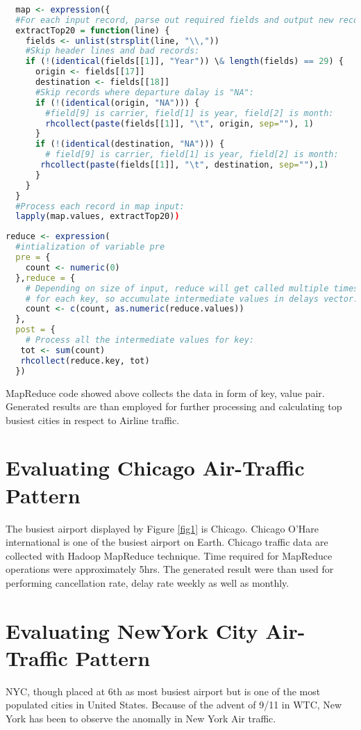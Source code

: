 \begin{lstlisting}[language=R]
  
  map <- expression({
  #For each input record, parse out required fields and output new record:
  extractTop20 = function(line) {
    fields <- unlist(strsplit(line, "\\,"))
    #Skip header lines and bad records:
    if (!(identical(fields[[1]], "Year")) \& length(fields) == 29) {
      origin <- fields[[17]]
      destination <- fields[[18]]
      #Skip records where departure dalay is "NA":
      if (!(identical(origin, "NA"))) {
        #field[9] is carrier, field[1] is year, field[2] is month:
        rhcollect(paste(fields[[1]], "\t", origin, sep=""), 1)
      }
      if (!(identical(destination, "NA"))) {
        # field[9] is carrier, field[1] is year, field[2] is month:
       rhcollect(paste(fields[[1]], "\t", destination, sep=""),1)
      }
    }
  }
  #Process each record in map input:
  lapply(map.values, extractTop20))
\end{lstlisting}

\begin{lstlisting}[language=R]
reduce <- expression(
  #intialization of variable pre
  pre = {
    count <- numeric(0)
  },reduce = {
    # Depending on size of input, reduce will get called multiple times
    # for each key, so accumulate intermediate values in delays vector: 
    count <- c(count, as.numeric(reduce.values))
  },
  post = {
    # Process all the intermediate values for key:
   tot <- sum(count)
   rhcollect(reduce.key, tot)            
  })
\end{lstlisting}

MapReduce code showed above collects the data in form of key, value pair. Generated results are than employed for further processing and calculating top busiest cities in respect  to Airline traffic.

\section{Evaluating Chicago Air-Traffic Pattern }
The busiest airport displayed by Figure \ref{fig1} is Chicago. Chicago O'Hare international is one of the busiest airport on Earth. Chicago traffic data are collected with Hadoop MapReduce technique. Time required for MapReduce operations were approximately 5hrs. The generated result were than used for performing cancellation rate, delay rate weekly as well as monthly.

\section{Evaluating NewYork City Air-Traffic Pattern}
NYC, though placed at 6th as most busiest airport but is one of the most populated cities in United States. Because of the advent of 9/11 in WTC, New York has been to observe the anomally in New York Air traffic.


